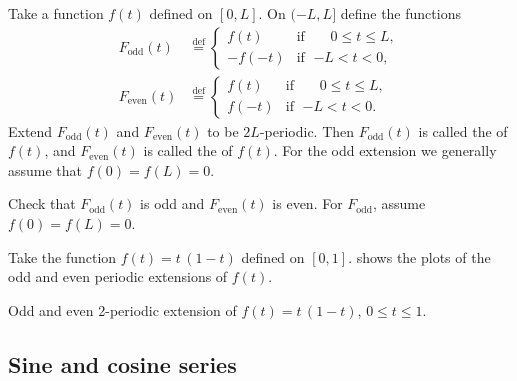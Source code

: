 \documentclass{ximera}
\begin{document}
Take a function $f(t)$ defined on $[0,L]$.  On $(-L,L]$ define the functions
\begin{align*}
    F_{\text{odd}}(t) & \overset{\text{def}}{=}
    \begin{cases}
        f(t) & \text{if } \; \phantom{-}0 \leq t \leq L , \\
        -f(-t) & \text{if } \; {-L} < t < 0 ,
    \end{cases} \\
    F_{\text{even}}(t) & \overset{\text{def}}{=}
    \begin{cases}
        f(t) & \text{if } \; \phantom{-}0 \leq t \leq L , \\
        f(-t) & \text{if } \; {-L} < t < 0 .
    \end{cases}
\end{align*}
Extend $F_{\text{odd}}(t)$ and $F_{\text{even}}(t)$ to be $2L$-periodic. Then $F_{\text{odd}}(t)$ is called the \emph{} of $f(t)$, and $F_{\text{even}}(t)$ is called the \emph{} of $f(t)$. For the odd extension we generally assume that $f(0) = f(L) = 0$.

\begin{exercise}
    Check that $F_{\text{odd}}(t)$ is odd and $F_{\text{even}}(t)$ is even. For $F_{\text{odd}}$, assume $f(0) = f(L) = 0$.
\end{exercise}

\begin{example}
    Take the function $f(t) = t\,(1-t)$ defined on $[0,1]$.  shows the plots of the odd and even periodic extensions of $f(t)$.
    
    \begin{myfig}
        \capstart
        \caption{Odd and even 2-periodic extension of $f(t) = t\,(1-t)$, $0 \leq t \leq 1$.\label{scs:oddevenextfig}}
    \end{myfig}
\end{example}

\subsection{Sine and cosine series}
\end{document}
